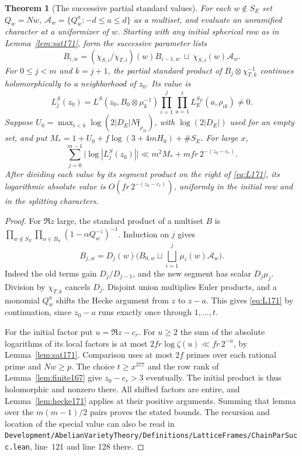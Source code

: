 \documentclass[a4paper,11pt]{article}
\newtheorem{theorem}[proposition]{Theorem}
\theoremstyle{definition}
\theoremstyle{remark}
\newcommand{\srcloc}[2]{{\small\nolinkurl{#1.lean}}, line~#2}
\numberwithin{equation}{section}
\begin{document}
\begin{theorem}[The successive partial standard values]
\label{thm:values171}
For each \(w\notin S_E\) set \(Q_w=Nw\),
\(\mathcal A_w=\{Q_w^a:-d\le a\le d\}\) as a multiset,
and evaluate an unramified character at a uniformizer of \(w\).
Starting with any initial spherical row as in Lemma~\ref{lem:sat171},
form the successive parameter lists
\[
 B_{i,w}=(\chi_{S,i}/\chi_{T,i})(w)B_{i-1,w}
                       \ \sqcup\ \chi_{S,i}(w)\mathcal A_w .
\]
For \(0\le j<m\) and \(k=j+1\), the partial standard product of
\(B_j\otimes\chi_{T,k}^{-1}\) continues holomorphically to a
neighborhood of \(z_0\). Its value is
\begin{equation}
 L_j^S(z_0)=L^S(z_0,B_0\otimes\mu_k^{-1})
                  \prod_{i=1}^j\prod_{a=1}^t L_E^{S_E}(a,\rho_{ik})
                       \ne0 .                              \label{eq:L171}
\end{equation}
Suppose \(U_0=\max_{i<k} \log(2|D_E|N\mathfrak f_{\rho_{ik}})\),
with \(\log(2|D_E|)\) used for an empty set, and put
\(M_*=1+U_0+f\log(3+4mH_0)+\#S_E\). For large \(x\),
\[
 \sum_{j=0}^{m-1}\big|\log|L_j^S(z_0)|\big|
       \ll m^2 M_*+mfr\,2^{-(z_0-c_r)} .
\]
After dividing each value by its segment product on the right
of \eqref{eq:L171}, its logarithmic absolute value is
\(O(fr\,2^{-(z_0-c_r)})\), uniformly in the initial row and
in the splitting characters.
\end{theorem}
\begin{proof}
For \(\Re z\) large, the standard product of a multiset \(B\)
is \(\prod_{w\notin S_E}\prod_{\alpha\in B_w}
(1-\alpha Q_w^{-z})^{-1}\). Induction on \(j\) gives
\[
 B_{j,w}=D_j(w)\Big(B_{0,w}\sqcup
                     \bigsqcup_{i=1}^j\mu_i(w)\mathcal A_w\Big).
\]
Indeed the old terms gain \(D_j/D_{j-1}\), and the new
segment has scalar \(D_j\mu_j\). Division by \(\chi_{T,k}\)
cancels \(D_j\). Disjoint union multiplies Euler products,
and a monomial \(Q_w^a\) shifts the Hecke argument from \(z\)
to \(z-a\). This gives \eqref{eq:L171} by continuation, since
\(z_0-a\) runs exactly once through \(1,\ldots,t\).

For the initial factor put \(u=\Re z-c_r\).
For \(u\ge2\) the sum of the absolute logarithms of its local
factors is at most \(2fr\log\zeta(u)\ll fr\,2^{-u}\),
by Lemma~\ref{lem:sat171}. Comparison uses at most \(2f\)
primes over each rational prime and \(Nw\ge p\).
The choice \(t\ge x^{377}\) and the row rank of
Lemma~\ref{lem:finite167} give \(z_0-c_r>3\) eventually.
The initial product is thus holomorphic and nonzero there.
All shifted factors are entire, and Lemma~\ref{lem:hecke171}
applies at their positive arguments. Summing that lemma over
the \(m(m-1)/2\) pairs proves the stated bounds. The
recursion and location of the special value can also be
read in \srcloc{Development/AbelianVarietyTheory/Definitions/LatticeFrames/ChainParSucc}{121}
and line 128 there.
\end{proof}
\end{document}
